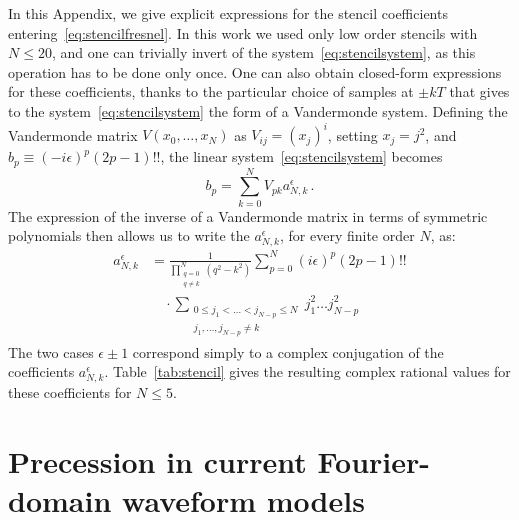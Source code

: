 \documentclass[aps,showpacs,twocolumn,
prd,superscriptaddress,nofootinbib]{revtex4-1}
\newcommand{\be}{\begin{equation}}
\newcommand{\ee}{\end{equation}}
\newcommand{\nn}{\nonumber}
\begin{document}
In this Appendix, we give explicit expressions for the stencil coefficients entering~\eqref{eq:stencilfresnel}. In this work we used only low order stencils with $N\leq 20$, and one can trivially invert of the system~\eqref{eq:stencilsystem}, as this operation has to be done only once. One can also obtain closed-form expressions for these coefficients, thanks to the particular choice of samples at $\pm kT$ that gives to the system~\eqref{eq:stencilsystem} the form of a Vandermonde system. Defining the Vandermonde matrix $V(x_{0},\dots,x_{N})$ as $V_{ij} = (x_{j})^{i}$, setting $x_{j} = j^{2}$, and $b_{p} \equiv (-i\epsilon)^{p}(2p-1)!!$, the linear system~\eqref{eq:stencilsystem} becomes
\be
	b_{p} = \sum\limits_{k=0}^{N} V_{pk} a_{N,k}^{\epsilon} \,.
\ee
The expression of the inverse of a Vandermonde matrix in terms of symmetric polynomials then allows us to write the $a_{N,k}^{\epsilon}$, for every finite order $N$, as:
\begin{align}
	a_{N,k}^{\epsilon} &= \frac{1}{\prod\limits_{\substack{q=0 \\ q\neq k}}^{N} (q^{2}-k^{2})} \sum\limits_{p=0}^{N} (i\epsilon)^{p}(2p-1)!! \nn\\ & \quad \cdot \sum\limits_{\substack{ 0 \leq j_{1} < \dots < j_{N-p} \leq N \\ j_{1}, \dots, j_{N-p} \neq k}} j_{1}^{2}\dots j_{N-p}^{2}
\end{align}
The two cases $\epsilon\pm 1$ correspond simply to a complex conjugation of the coefficients $a_{N,k}^{\epsilon}$. Table~\ref{tab:stencil} gives the resulting complex rational values for these coefficients for $N\leq 5$.

\section{Precession in current Fourier-domain waveform models}
\label{app:precpreviousapproaches}
\end{document}
